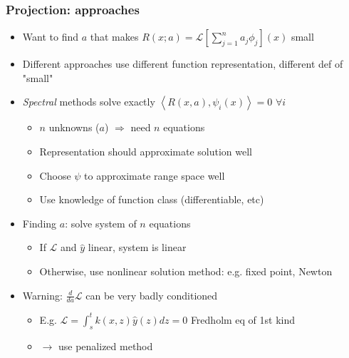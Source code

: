 \documentclass[bigger,handout]{beamer}
\begin{document}
 
 
\begin{frame}%
  
\frametitle{Projection: approaches}

\begin{itemize}
\item Want to find $a$ that makes $R\left( x;a\right)=\mathcal{L}\left[\sum_{j=1}^{n}a_j\phi_j\right](x) $ small
\item Different approaches use different function representation, different def of "small"
\item \emph{Spectral} methods solve exactly $\left\langle R(x,a),\psi_i(x)\right\rangle=0$ $\forall i$

\begin{itemize}
\item $n$ unknowns ($a$) $\Rightarrow $ need $n$ equations
\item Representation should approximate solution well
\item Choose $\psi$ to approximate range space well
\item Use knowledge of function class (differentiable, etc)
\end{itemize}

\item Finding $a$: solve system of $n$ equations
\begin{itemize}
\item If $\mathcal{L}$ and $\hat{y}$ linear, system is linear
\item Otherwise, use nonlinear solution method: e.g. fixed point, Newton
\end{itemize}
\item Warning: $\frac{d}{da}\mathcal{L}$ can be very badly conditioned
\begin{itemize}
\item E.g. $\mathcal{L}=\int_{s}^{t}k(x,z)\hat{y}(z)dz=0$ Fredholm eq of 1st kind
\item $\to$ use penalized method
\end{itemize}

\end{itemize}
 
\end{frame}%
\end{document}

